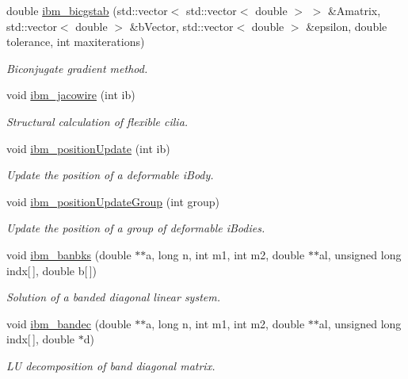 \begin{DoxyCompactItemize}
double \hyperlink{class_object_manager_adad4317bfbe5bae833c4ffa3e4538d92}{ibm\+\_\+bicgstab} (std\+::vector$<$ std\+::vector$<$ double $>$ $>$ \&Amatrix, std\+::vector$<$ double $>$ \&b\+Vector, std\+::vector$<$ double $>$ \&epsilon, double tolerance, int maxiterations)
\begin{DoxyCompactList}\small\item\em Biconjugate gradient method. \end{DoxyCompactList}\item 
void \hyperlink{class_object_manager_a956c12cba071c6b8844371c03433f82c}{ibm\+\_\+jacowire} (int ib)
\begin{DoxyCompactList}\small\item\em Structural calculation of flexible cilia. \end{DoxyCompactList}\item 
void \hyperlink{class_object_manager_a8315e05afcfbfd1bac21d3d53391bd4e}{ibm\+\_\+position\+Update} (int ib)
\begin{DoxyCompactList}\small\item\em Update the position of a deformable i\+Body. \end{DoxyCompactList}\item 
void \hyperlink{class_object_manager_a4108e20548dc7b2b4a3852dd33e6a2d1}{ibm\+\_\+position\+Update\+Group} (int group)
\begin{DoxyCompactList}\small\item\em Update the position of a group of deformable i\+Bodies. \end{DoxyCompactList}\item 
void \hyperlink{class_object_manager_a7bf970976700f9949bb08d8dc7f8e637}{ibm\+\_\+banbks} (double $\ast$$\ast$a, long n, int m1, int m2, double $\ast$$\ast$al, unsigned long indx\mbox{[}$\,$\mbox{]}, double b\mbox{[}$\,$\mbox{]})
\begin{DoxyCompactList}\small\item\em Solution of a banded diagonal linear system. \end{DoxyCompactList}\item 
void \hyperlink{class_object_manager_a77eb5ec758b5956e0a609fa1fba2f8e8}{ibm\+\_\+bandec} (double $\ast$$\ast$a, long n, int m1, int m2, double $\ast$$\ast$al, unsigned long indx\mbox{[}$\,$\mbox{]}, double $\ast$d)
\begin{DoxyCompactList}\small\item\em LU decomposition of band diagonal matrix. \end{DoxyCompactList}\item 

\end{DoxyCompactItemize}
